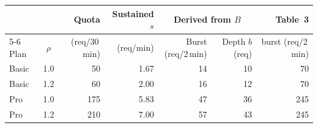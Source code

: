 \begin{tabular}{lcrrrrr}
\toprule
 & & Quota & Sustained $s$ & \multicolumn{2}{c}{Derived from $B$} & Table~3 \\
\cmidrule(lr){5-6}
Plan & $\rho$ & (req/30\,min) & (req/min) & Burst (req/2\,min) & Depth $b$ (req) & burst (req/2\,min) \\
\midrule
Basic & 1.0 & 50 & 1.67 & 14 & 10 & 70 \\
Basic & 1.2 & 60 & 2.00 & 16 & 12 & 70 \\
Pro & 1.0 & 175 & 5.83 & 47 & 36 & 245 \\
Pro & 1.2 & 210 & 7.00 & 57 & 43 & 245 \\
\bottomrule
\end{tabular}
